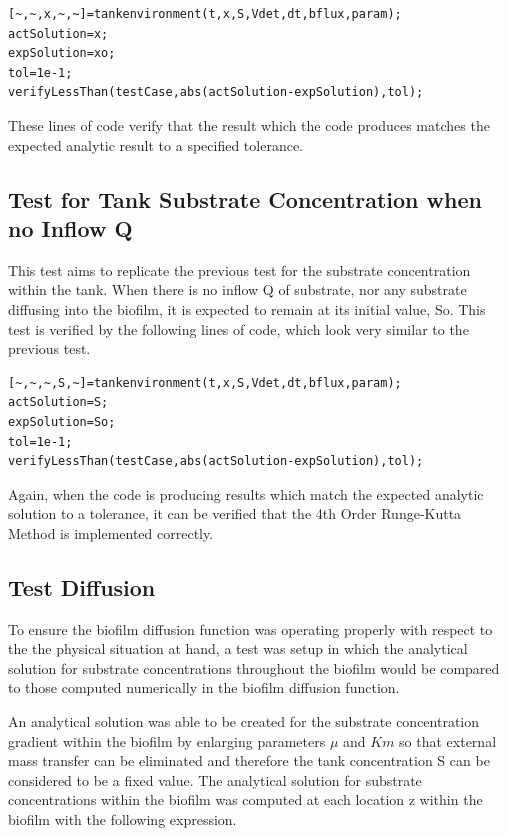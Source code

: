 \documentclass[letterpaper, twoside]{article}
\numberwithin{equation}{section}
\begin{document}
\begin{lstlisting}
[~,~,x,~,~]=tankenvironment(t,x,S,Vdet,dt,bflux,param);
actSolution=x;
expSolution=xo;
tol=1e-1;
verifyLessThan(testCase,abs(actSolution-expSolution),tol);
\end{lstlisting}

These lines of code verify that the result which the code produces matches the expected analytic result to a specified tolerance.

\subsection{Test for Tank Substrate Concentration when no Inflow Q}
This test aims to replicate the previous test for the substrate concentration within the tank. When there is no inflow Q of substrate, nor any substrate diffusing into the biofilm, it is expected to remain at its initial value, So. This test is verified by the following lines of code, which look very similar to the previous test.

\begin{lstlisting}
[~,~,~,S,~]=tankenvironment(t,x,S,Vdet,dt,bflux,param);
actSolution=S; 
expSolution=So;
tol=1e-1;
verifyLessThan(testCase,abs(actSolution-expSolution),tol); 
\end{lstlisting}

Again, when the code is producing results which match the expected analytic solution to a tolerance, it can be verified that the 4th Order Runge-Kutta Method is implemented correctly.

\subsection{Test Diffusion}
To ensure the biofilm diffusion function was operating properly with respect to the the physical situation at hand, a test was setup in which the analytical solution for substrate concentrations throughout the biofilm would be compared to those computed numerically in the biofilm diffusion function.

An analytical solution was able to be created for the substrate concentration gradient within the biofilm by enlarging parameters $\mu$ and $Km$ so that external mass transfer can be eliminated and therefore the tank concentration S can be considered to be a fixed value. The analytical solution for substrate concentrations within the biofilm was computed at each location z within the biofilm with the following expression.
\end{document}
